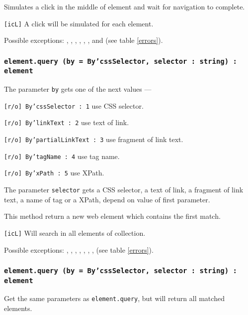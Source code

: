 Simulates a click in the middle of element and wait for navigation to complete.

\texttt{[icL]} A click will be simulated for each element.

Possible exceptions: , , , , , ,  and  (see table \ref{errors}).

\subsubsection{\texttt{element.query (by = By'cssSelector, selector : string) : element}}

The parameter \texttt{by} gets one of the next values —
\begin{icItems}
    \item \texttt{[r/o] By'cssSelector : 1} use CSS selector.
	\item \texttt{[r/o] By'linkText : 2} use text of link.
	\item \texttt{[r/o] By'partialLinkText : 3} use fragment of link text.
	\item \texttt{[r/o] By'tagName : 4} use tag name.
	\item \texttt{[r/o] By'xPath : 5} use XPath.
\end{icItems}

The parameter \texttt{selector} gets a CSS selector, a text of link, a fragment of link text, a name of tag or a XPath, depend on value of first parameter.

This method return a new web element which contains the first match.

\texttt{[icL]} Will search in all elements of collection.

Possible exceptions: , , , , , , ,  (see table \ref{errors}).

\subsubsection{\texttt{element.query (by = By'cssSelector, selector : string) : element}}

Get the same parameters as \texttt{element.query}, but will return all matched elements.

